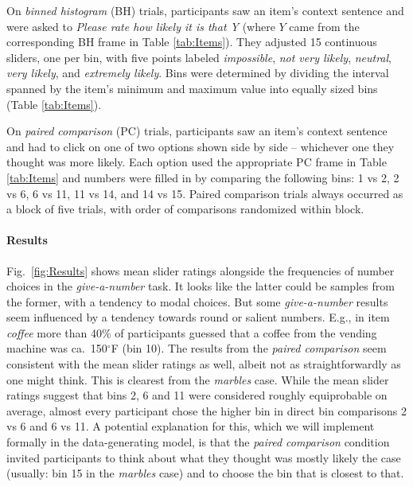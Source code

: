 \documentclass[10pt,letterpaper]{article}
\newcommand{\tableref}[1]{Table \ref{#1}}
\newcommand{\figref}[1]{Fig.~\ref{#1}}
\begin{document}
On \emph{binned histogram} (BH) trials, participants saw an item's context sentence and were
asked to \emph{Please rate how likely it is that Y} (where $Y$ came from the corresponding BH
frame in \tableref{tab:Items}). They adjusted 15 continuous sliders, one per bin, with five
points labeled \emph{impossible}, \emph{not very likely}, \emph{neutral}, \emph{very likely},
and \emph{extremely likely}. Bins were determined by dividing the interval spanned by
the item's minimum and maximum value into equally sized bins (\tableref{tab:Items}).



On \emph{paired comparison} (PC) trials, participants saw an item's context sentence and had to
click on one of two options shown side by side -- whichever one they thought was more likely.
Each option used the appropriate PC frame in \tableref{tab:Items} and numbers were filled in by
comparing the following bins: 1 vs 2, 2 vs 6, 6 vs 11, 11 vs 14, and 14 vs 15. Paired
comparison trials always occurred as a block of five trials, with order of comparisons
randomized within block.


\paragraph{Results} \figref{fig:Results} shows mean slider ratings alongside the frequencies of
number choices in the \emph{give-a-number} task. It looks like the latter could be samples from
the former, with a tendency to modal choices. But some \emph{give-a-number} results seem
influenced by a tendency towards round or salient numbers. E.g., in item \emph{coffee} more
than 40\% of participants guessed that a coffee from the vending machine was ca.~150$^{\circ}$F
(bin 10). The results from the \emph{paired comparison} seem consistent with the mean slider
ratings as well, albeit not as straightforwardly as one might think. This is clearest from the
\emph{marbles} case. While the mean slider ratings suggest that bins 2, 6 and 11 were
considered roughly equiprobable on average, almost every participant chose the higher bin in
direct bin comparisons 2 vs 6 and 6 vs 11. A potential explanation for this, which we will
implement formally in the data-generating model, is that the \emph{paired comparison} condition
invited participants to think about what they thought was mostly likely the case (usually: bin
15 in the \emph{marbles} case) and to choose the bin that is closest to that.
\end{document}
